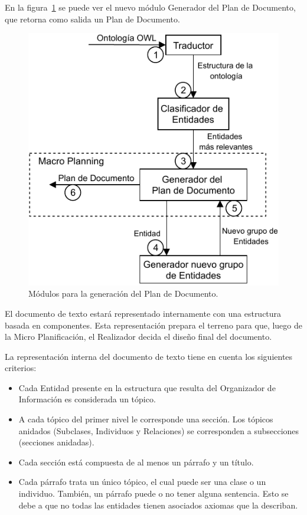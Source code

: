 En la figura~\ref{fig:modulos_plan_documento} se puede ver el nuevo módulo Generador del Plan de Documento, que retorna como salida un Plan de Documento.

\begin{figure}
    \centering
    \includegraphics{img/generacion_documento/modulos_plan_documento.pdf}
    \caption{Módulos para la generación del Plan de Documento.}
    \label{fig:modulos_plan_documento}
\end{figure}

El documento de texto estará representado internamente con una estructura basada en componentes. Esta representación prepara el terreno para que, luego de la Micro Planificación, el Realizador decida el diseño final del documento.

La representación interna del documento de texto tiene en cuenta los siguientes criterios:
\begin{itemize}
    \item Cada Entidad presente en la estructura que resulta del Organizador de Información es considerada un tópico. 
    \item A cada tópico del primer nivel le corresponde una sección. Los tópicos anidados (Subclases, Individuos y Relaciones) se corresponden a subsecciones (secciones anidadas).
    \item Cada sección está compuesta de al menos un párrafo y un título.
    \item Cada párrafo trata un único tópico, el cual puede ser una clase o un individuo. También, un párrafo puede o no tener alguna sentencia. Esto se debe a que no todas las entidades tienen asociados axiomas que la describan.
\end{itemize}

